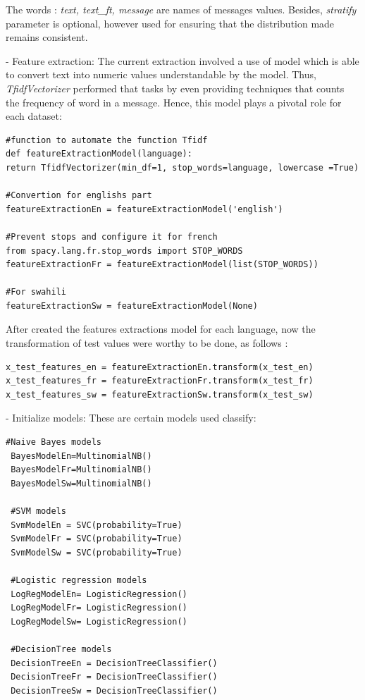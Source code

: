\documentclass[12pt,a4paper, oneside]{book}
\begin{document}
The words : \textit{text, text\_ft, message} are names of messages values. Besides, \textit{stratify} parameter is optional, however used for ensuring that the distribution made remains consistent.
 
- Feature extraction:
 The current extraction involved a use of model which is able to convert text into numeric values understandable by the model. Thus, \textit{TfidfVectorizer} performed that tasks by even providing techniques that counts the frequency of word in a message. Hence, this model plays a pivotal role for each dataset:

\begin{lstlisting}[style=stylejupyter]
#function to automate the function Tfidf 
def featureExtractionModel(language):
return TfidfVectorizer(min_df=1, stop_words=language, lowercase =True)   
 	
#Convertion for englishs part
featureExtractionEn = featureExtractionModel('english')
 	
#Prevent stops and configure it for french
from spacy.lang.fr.stop_words import STOP_WORDS
featureExtractionFr = featureExtractionModel(list(STOP_WORDS))  
 	
#For swahili
featureExtractionSw = featureExtractionModel(None) 
 \end{lstlisting}
 After created the features extractions model for each language, now the transformation of test values were worthy to be done, as follows :
 \begin{lstlisting}[style=stylejupyter]
x_test_features_en = featureExtractionEn.transform(x_test_en)
x_test_features_fr = featureExtractionFr.transform(x_test_fr)
x_test_features_sw = featureExtractionSw.transform(x_test_sw)
 \end{lstlisting}  
 
 - Initialize models: These are certain models used classify:
 \begin{lstlisting}[style=stylejupyter]
 #Naive Bayes models
 BayesModelEn=MultinomialNB()  
 BayesModelFr=MultinomialNB() 
 BayesModelSw=MultinomialNB() 
 
 #SVM models
 SvmModelEn = SVC(probability=True)
 SvmModelFr = SVC(probability=True)
 SvmModelSw = SVC(probability=True)
 
 #Logistic regression models
 LogRegModelEn= LogisticRegression() 
 LogRegModelFr= LogisticRegression() 
 LogRegModelSw= LogisticRegression() 
 
 #DecisionTree models
 DecisionTreeEn = DecisionTreeClassifier()
 DecisionTreeFr = DecisionTreeClassifier()
 DecisionTreeSw = DecisionTreeClassifier()
 \end{lstlisting}
\end{document}
